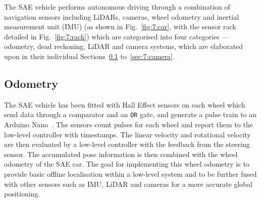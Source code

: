 The SAE vehicle performs autonomous driving through a combination of navigation sensors including LiDARs, cameras, wheel odometry and inertial measurement unit (IMU) (as shown in Fig.~\ref{fig:7:car}, with the sensor rack detailed in Fig.~\ref{fig:7:rack}) which are categorised into four categories --- odometry, dead reckoning, LiDAR and camera systems, which are elaborated upon in their individual Sections~\ref{sec:7:odometry} to~\ref{sec:7:camera}.

\subsection{Odometry}\label{sec:7:odometry}
The SAE vehicle has been fitted with Hall Effect sensors on each wheel which send data through a comparator and an \texttt{OR} gate, and generate a pulse train to an Arduino Nano~\cite{arduino_arduino_nodate-1}. The sensors count pulses for each wheel and report them to the low-level controller with timestamps. The linear velocity and rotational velocity are then evaluated by a low-level controller with the feedback from the steering sensor. The accumulated pose information is then combined with the wheel odometry of the SAE car. The goal for implementing this wheel odometry is to provide basic offline localisation within a low-level system and to be further fused with other sensors such as IMU, LiDAR and cameras for a more accurate global positioning.

